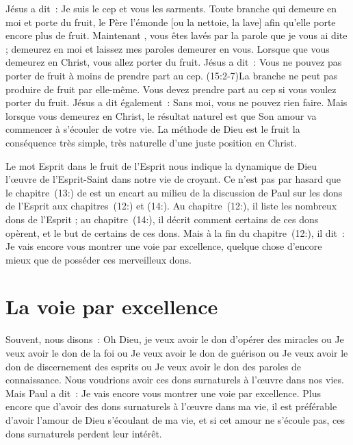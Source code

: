 Jésus a dit~: \og Je suis le cep et vous les sarments.
 Toute branche qui demeure en moi et porte du fruit,
 le Père l'émonde [ou la nettoie, la lave] afin qu'elle porte
 encore plus de fruit. Maintenant , vous êtes lavés par la parole
 que je vous ai dite ; demeurez en moi et laissez mes paroles
 demeurer en vous. \fg{}
 Lorsque que vous demeurez en Christ, vous allez porter du fruit.
 Jésus a dit~: \og Vous ne pouvez pas porter de fruit à moins
 de prendre part au cep. \fg{} (15:2-7)La branche
 ne peut pas produire de fruit par elle-même.
 Vous devez prendre part au cep si vous voulez porter du fruit.
 Jésus a dit également~: \og Sans moi, vous ne pouvez rien faire. \fg{}
 Mais lorsque vous demeurez en Christ, le résultat naturel
 est que Son amour va commencer à s'écouler de votre vie.
 La méthode de Dieu est le fruit \ocadr la conséquence très simple,
 très naturelle d'une juste position en Christ.

Le mot \og Esprit \fg{} dans \og le fruit de l'Esprit \fg{}
 nous indique la dynamique de Dieu \ocadr l'œuvre de l'Esprit-Saint
 dans notre vie de croyant. Ce n'est pas par hasard que le
 chapitre~(13:) de  est un encart
 au milieu de la discussion de Paul sur les dons de l'Esprit
 aux chapitres~(12:) et (14:).
 Au chapitre~(12:), il liste les nombreux dons de l'Esprit ;
 au chapitre~(14:), il décrit comment certains de ces dons
 opèrent, et le but de certains de ces dons.
 Mais à la fin du chapitre~(12:), il dit~:
 \og Je vais encore vous montrer une voie par excellence, \fg{}
 quelque chose d'encore mieux que de posséder ces merveilleux dons.


\section*{La voie par excellence}

Souvent, nous disons~:
 \og Oh Dieu, je veux avoir le don d'opérer des miracles \fg{} ou
 \og Je veux avoir le don de la foi \fg{} ou
 \og Je veux avoir le don de guérison \fg{} ou
 \og Je veux avoir le don de discernement des esprits \fg{} ou
 \og Je veux avoir le don des paroles de connaissance. \fg{}
 Nous voudrions avoir ces dons surnaturels à l'œuvre dans nos vies.
 Mais Paul a dit~:
 \og Je vais encore vous montrer une voie par excellence. \fg{}
 Plus encore que d'avoir des dons surnaturels à l'œuvre dans ma vie,
 il est préférable d'avoir l'amour de Dieu s'écoulant de ma vie,
 et si cet amour ne s'écoule pas, ces dons surnaturels perdent leur intérêt.

